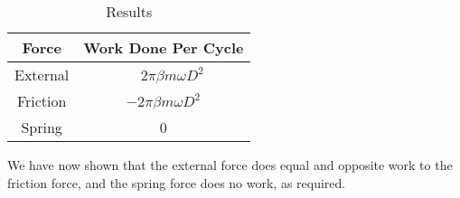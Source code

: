 \documentclass{article}
\begin{document}
\begin{table}[H]
	\centering
	\begin{tabular}{cc}
		\toprule
		\textbf{Force} & \textbf{Work Done Per Cycle} \\
		\midrule
		External & $\phantom{-}2\pi\beta m\omega D^2$ \\
		Friction & $-2\pi\beta m\omega D^2$ \\
		Spring & 0 \\
		\bottomrule
	\end{tabular}
	\caption{Results}
\end{table}

We have now shown that the external force does equal and opposite work to the friction force, and the spring force does no work, as required.
\end{document}
